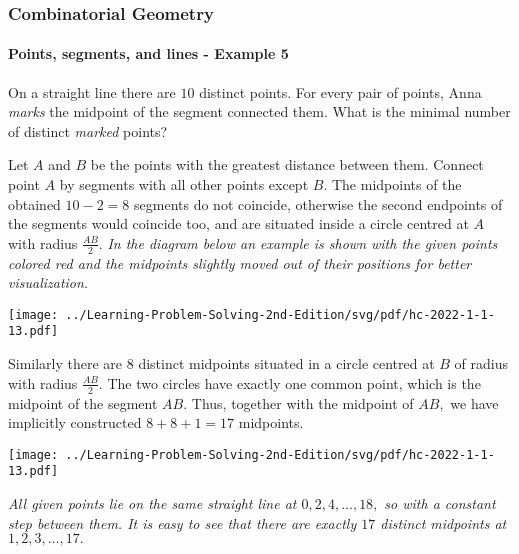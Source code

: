 \documentclass[8pt,xcolor=table,dvipsnames]{beamer}
\begin{document}
\begin{frame}[t]
    \frametitle{Combinatorial Geometry}
    \framesubtitle{Points, segments, and lines - Example 5}
    \begin{example}[MIC-2022-SM2-R1-S9]
        On a straight line there are $10$ distinct points.
        For every pair of points,
        Anna \textit{marks} the midpoint of the segment connected them.
        What is the minimal number of distinct \textit{marked} points?
    \end{example}
    \begin{overprint}
        Let $A$ and $B$ be the points with the greatest distance between them.
        Connect point $A$ by segments with all other points except $B$.
        The midpoints of the obtained $10 - 2 = 8$ segments do not coincide, 
        otherwise the second endpoints of the segments would coincide too,
        and are situated inside a circle centred at $A$ with radius $\frac{AB}{2}.$
        \textit{In the diagram below an example is shown with the given points colored red and
        the midpoints slightly moved out of their positions for better visualization.}    
        \begin{center}
            \texttt{[image: ../Learning-Problem-Solving-2nd-Edition/svg/pdf/hc-2022-1-1-13.pdf]}
        \end{center}
        Similarly there are $8$ distinct midpoints situated in a circle centred at $B$ of radius
        with radius $\frac{AB}{2}.$ The two circles have exactly one common point,
        which is the midpoint of the segment $AB.$ Thus, together with the midpoint of $AB,$
        we have implicitly constructed $8 + 8 + 1 = \boxed{17}$ midpoints.
        \begin{center}
            \texttt{[image: ../Learning-Problem-Solving-2nd-Edition/svg/pdf/hc-2022-1-1-13.pdf]}
        \end{center}
        \textit{All given points lie on the same straight line at $0, 2, 4, \ldots, 18,$ so with a constant step between them. 
        It is easy to see that there are exactly $17$ distinct midpoints at $1, 2, 3, \ldots, 17.$}
    \end{overprint}
\end{frame}
\end{document}
